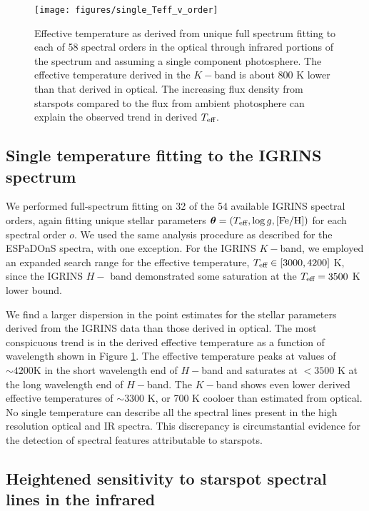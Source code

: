 \documentclass[12pt]{report}
\begin{document}
\begin{figure}
 \centering
 \texttt{[image: figures/single\_Teff\_v\_order]}
 \caption[Effective temperature derived from spectral inference in 58 spectral orders]{Effective temperature as derived from unique full spectrum fitting to each of 58 spectral orders in the optical through infrared portions of the spectrum and assuming a single component photosphere.  The effective temperature derived in the $K-$band is about 800 K lower than that derived in optical.  The increasing flux density from starspots compared to the flux from ambient photosphere can explain the observed trend in derived $T_\textrm{eff}$.}
 \label{fig:SingleTeffvsOrder}
\end{figure}

\subsection{Single temperature fitting to the IGRINS spectrum}\label{sec:IGR_starfish}

We performed full-spectrum fitting on 32 of the 54 available IGRINS spectral orders, again fitting unique stellar parameters ${\bm \theta} = (T_\textrm{eff}, \log g, [{\rm Fe}/{\rm H}])$ for each spectral order $o$.  We used the same analysis procedure as described for the ESPaDOnS spectra, with one exception.  For the IGRINS $K-$band, we employed an expanded search range for the effective temperature, $T_\textrm{eff} \in [3000, 4200]$ K, since the IGRINS $H-$ band demonstrated some saturation at the $T_\textrm{eff}=3500$ K lower bound.  

We find a larger dispersion in the point estimates for the stellar parameters derived from the IGRINS data than those derived in optical.  The most conspicuous trend is in the derived effective temperature as a function of wavelength shown in Figure \ref{fig:SingleTeffvsOrder}.  The effective temperature peaks at values of $\sim4200$K in the short wavelength end of $H-$band and saturates at $<3500$ K at the long wavelength end of $H-$band.  The $K-$band shows even lower derived effective temperatures of $\sim3300$ K, or 700 K cooloer than estimated from optical.  No single temperature can describe all the spectral lines present in the high resolution optical and IR spectra.  This discrepancy is circumstantial evidence for the detection of spectral features attributable to starspots.  


\subsection{Heightened sensitivity to starspot spectral lines in the infrared}\label{sec:whyNearIR}
\end{document}
